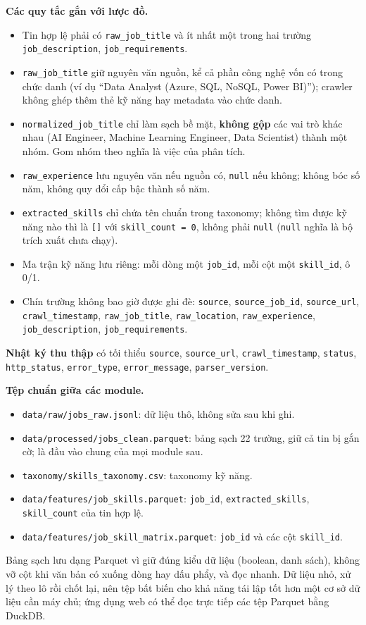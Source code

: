 \documentclass[12pt]{article}
\newcommand{\code}[1]{\texttt{#1}}
\begin{document}
\textbf{Các quy tắc gắn với lược đồ.}
\begin{itemize}[noitemsep, topsep=2pt, leftmargin=2.5em]
\item Tin hợp lệ phải có \code{raw\_job\_title} và ít nhất một trong hai trường \code{job\_description}, \code{job\_requirements}.
\item \code{raw\_job\_title} giữ nguyên văn nguồn, kể cả phần công nghệ vốn có trong chức danh (ví dụ ``Data Analyst (Azure, SQL, NoSQL, Power BI)''); crawler không ghép thêm thẻ kỹ năng hay metadata vào chức danh.
\item \code{normalized\_job\_title} chỉ làm sạch bề mặt, \textbf{không gộp} các vai trò khác nhau (AI Engineer, Machine Learning Engineer, Data Scientist) thành một nhóm. Gom nhóm theo nghĩa là việc của phân tích.
\item \code{raw\_experience} lưu nguyên văn nếu nguồn có, \code{null} nếu không; không bóc số năm, không quy đổi cấp bậc thành số năm.
\item \code{extracted\_skills} chỉ chứa tên chuẩn trong taxonomy; không tìm được kỹ năng nào thì là \code{[]} với \code{skill\_count = 0}, không phải \code{null} (\code{null} nghĩa là bộ trích xuất chưa chạy).
\item Ma trận kỹ năng lưu riêng: mỗi dòng một \code{job\_id}, mỗi cột một \code{skill\_id}, ô 0/1.
\item Chín trường không bao giờ được ghi đè: \code{source}, \code{source\_job\_id}, \code{source\_url}, \code{crawl\_timestamp}, \code{raw\_job\_title}, \code{raw\_location}, \code{raw\_experience}, \code{job\_description}, \code{job\_requirements}.
\end{itemize}

\textbf{Nhật ký thu thập} có tối thiểu \code{source}, \code{source\_url}, \code{crawl\_timestamp}, \code{status}, \code{http\_status}, \code{error\_type}, \code{error\_message}, \code{parser\_version}.

\textbf{Tệp chuẩn giữa các module.}
\begin{itemize}[noitemsep, topsep=2pt, leftmargin=2.5em]
\item \code{data/raw/jobs\_raw.jsonl}: dữ liệu thô, không sửa sau khi ghi.
\item \code{data/processed/jobs\_clean.parquet}: bảng sạch 22 trường, giữ cả tin bị gắn cờ; là đầu vào chung của mọi module sau.
\item \code{taxonomy/skills\_taxonomy.csv}: taxonomy kỹ năng.
\item \code{data/features/job\_skills.parquet}: \code{job\_id}, \code{extracted\_skills}, \code{skill\_count} của tin hợp lệ.
\item \code{data/features/job\_skill\_matrix.parquet}: \code{job\_id} và các cột \code{skill\_id}.
\end{itemize}
Bảng sạch lưu dạng Parquet vì giữ đúng kiểu dữ liệu (boolean, danh sách), không vỡ cột khi văn bản có xuống dòng hay dấu phẩy, và đọc nhanh. Dữ liệu nhỏ, xử lý theo lô rồi chốt lại, nên tệp bất biến cho khả năng tái lập tốt hơn một cơ sở dữ liệu cần máy chủ; ứng dụng web có thể đọc trực tiếp các tệp Parquet bằng DuckDB.
\end{document}
